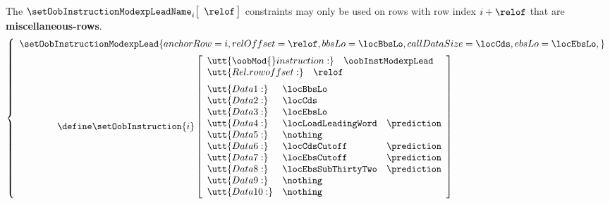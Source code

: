 \saNote{} The $\setOobInstructionModexpLeadName _{i} \big[ \, \relof \, \big]$ constraints may only be used on rows with row index $i + \relof$ that are \textbf{miscellaneous-rows}.
\[
        \left\{ \begin{array}{l}
                \setOobInstructionModexpLead {
                        anchorRow    = i         ,
                        relOffset    = \relof    ,
                        bbsLo        = \locBbsLo ,
                        callDataSize = \locCds   ,
                        ebsLo        = \locEbsLo ,
                        }
                \vspace{2mm} \\
                \qquad \qquad \define
                \setOobInstruction{i}
                \left[ \begin{array}{llr}
                        \multicolumn{3}{l}{\utt{\oobMod{} instruction:} \quad \oobInstModexpLead}          \\
                        \multicolumn{3}{l}{\utt{Rel. row offset:}            \quad \relof}         \vspace{2mm} \\
                        \utt{Data 1:}  & \locBbsLo           \\
                        \utt{Data 2:}  & \locCds             \\
                        \utt{Data 3:}  & \locEbsLo           \\
                        \utt{Data 4:}  & \locLoadLeadingWord  & \prediction \\
                        \utt{Data 5:}  & \nothing            \\
                        \utt{Data 6:}  & \locCdsCutoff        & \prediction \\
                        \utt{Data 7:}  & \locEbsCutoff        & \prediction \\
                        \utt{Data 8:}  & \locEbsSubThirtyTwo  & \prediction \\
                        \utt{Data 9:}  & \nothing            \\
                        \utt{Data 10:} & \nothing            \\
                \end{array} \right] \\
        \end{array} \right.
\]
